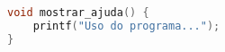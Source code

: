\usepackage{listings}\begin{lstlisting}[language=C, caption={Exemplo de Função}]
void mostrar_ajuda() {
    printf("Uso do programa...");
}
\end{lstlisting}
